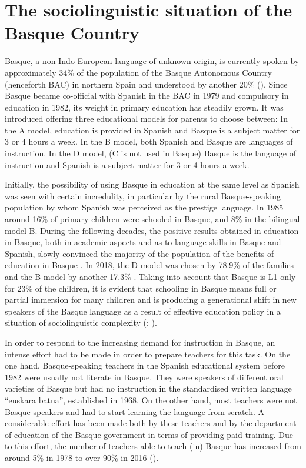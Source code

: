 \documentclass[output=paper]{../langscibook}
\begin{document}
\section{The sociolinguistic situation of the Basque Country}
\largerpage

Basque, a non-Indo-European language of unknown origin, is currently spoken by approximately 34\% of the population of the Basque Autonomous Country (henceforth BAC) in northern Spain and understood by another 20\% (\citealt{BasqueGovernment2017}). Since Basque became co-official with Spanish in the BAC in 1979 and compulsory in education in 1982, its weight in primary education has steadily grown. It was introduced offering three educational models for parents to choose between: In the A model, education is provided in Spanish and Basque is a subject matter for 3 or 4 hours a week. In the B model, both Spanish and Basque are languages of instruction. In the D model, (C is not used in Basque) Basque is the language of instruction and Spanish is a subject matter for 3 or 4 hours a week.

\largerpage
Initially, the possibility of using Basque in education at the same level as Spanish was seen with certain incredulity, in particular by the rural Basque-speaking population by whom Spanish was perceived as the prestige language. In 1985 around 16\% of primary children were schooled in Basque, and 8\% in the bilingual model B. During the following decades, the positive results obtained in education in Basque, both in academic aspects and as to language skills in Basque and Spanish, slowly convinced the majority of the population of the benefits of education in Basque \citep{Cenoz2009}. In 2018, the D model was chosen by 78.9\% of the families and the B model by another 17.3\% \citep{BasqueGovernment2018}. Taking into account that Basque is L1 only for 23\% of the children, it is evident that schooling in Basque means full or partial immersion for many children and is producing a generational shift in new speakers of the Basque language as a result of effective education policy in a situation of sociolinguistic complexity (\citealt{AmorrortuEtAl2009};  \citealt{OrtegaEtAl2015}).

 In order to respond to the increasing demand for instruction in Basque, an intense effort had to be made in order to prepare teachers for this task. On the one hand, Basque-speaking teachers in the Spanish educational system before 1982 were usually not literate in Basque. They were speakers of different oral varieties of Basque but had no instruction in the standardised written language “euskara batua”, established in 1968. On the other hand, most teachers were not Basque speakers and had to start learning the language from scratch. A considerable effort has been made both by these teachers and by the department of education of the Basque government in terms of providing paid training. Due to this effort, the number of teachers able to teach (in) Basque has increased from around 5\% in 1978 to over 90\% in 2016 (\citealt{BasqueGovernment2017}).
\end{document}
